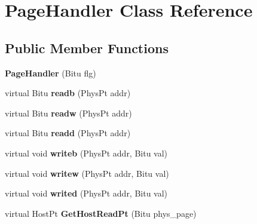 \hypertarget{classPageHandler}{\section{Page\-Handler Class Reference}
\label{classPageHandler}
}
\subsection*{Public Member Functions}
\begin{DoxyCompactItemize}
\item 
\hypertarget{classPageHandler_a009efc4a2c49e562c8a0e0dca2bb91eb}{{\bfseries Page\-Handler} (Bitu flg)}\label{classPageHandler_a009efc4a2c49e562c8a0e0dca2bb91eb}

\item 
\hypertarget{classPageHandler_a39d7c43c63715cc0b5efb54a7f434824}{virtual Bitu {\bfseries readb} (Phys\-Pt addr)}\label{classPageHandler_a39d7c43c63715cc0b5efb54a7f434824}

\item 
\hypertarget{classPageHandler_a522986972443c1b119c0a99424c0c1bd}{virtual Bitu {\bfseries readw} (Phys\-Pt addr)}\label{classPageHandler_a522986972443c1b119c0a99424c0c1bd}

\item 
\hypertarget{classPageHandler_a749457849409285962bb38e86f6a6894}{virtual Bitu {\bfseries readd} (Phys\-Pt addr)}\label{classPageHandler_a749457849409285962bb38e86f6a6894}

\item 
\hypertarget{classPageHandler_a9685fa05bd349fc3325cc059e5cd44b2}{virtual void {\bfseries writeb} (Phys\-Pt addr, Bitu val)}\label{classPageHandler_a9685fa05bd349fc3325cc059e5cd44b2}

\item 
\hypertarget{classPageHandler_ae5873d0423b8ea9de075a378a9dc47ff}{virtual void {\bfseries writew} (Phys\-Pt addr, Bitu val)}\label{classPageHandler_ae5873d0423b8ea9de075a378a9dc47ff}

\item 
\hypertarget{classPageHandler_a116ca7214590f4db1dbc8ae344190715}{virtual void {\bfseries writed} (Phys\-Pt addr, Bitu val)}\label{classPageHandler_a116ca7214590f4db1dbc8ae344190715}

\item 
\hypertarget{classPageHandler_a534d5f4a140aa1ea1d6f733b5879a292}{virtual Host\-Pt {\bfseries Get\-Host\-Read\-Pt} (Bitu phys\-\_\-page)}\label{classPageHandler_a534d5f4a140aa1ea1d6f733b5879a292}


\end{DoxyCompactItemize}

